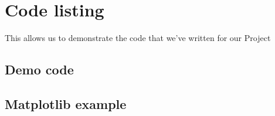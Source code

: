 \section{Code listing}
\label{sec:code_listing}

This allows us to demonstrate the code that we've written for our Project

\subsection{Demo code}



\subsection{Matplotlib example}
\label{sec:matplotlib_example}




\raggedbottom